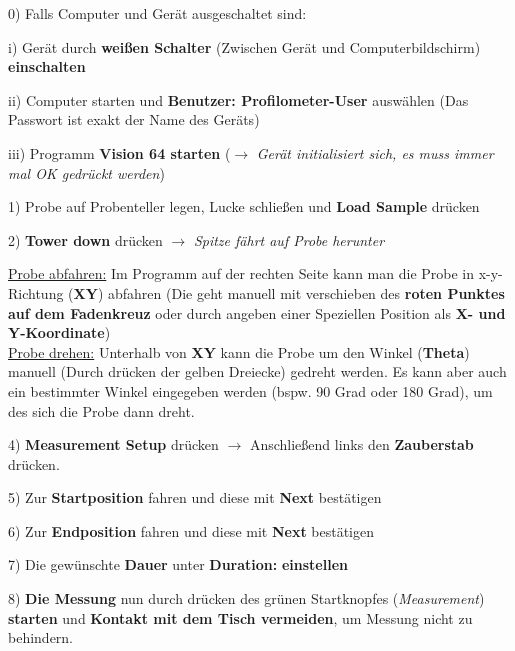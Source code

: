 \documentclass[12pt,a4paper]{article}
\begin{document}
\begin{description}
\item 0) Falls Computer und Gerät ausgeschaltet sind:
\begin{description}
\item i) Gerät durch \textbf{weißen Schalter} (Zwischen Gerät und Computerbildschirm) \textbf{einschalten}
\item ii) Computer starten und \textbf{Benutzer: Profilometer-User} auswählen (Das Passwort ist exakt der Name des Geräts)
\item iii) Programm \textbf{Vision 64 starten} ($\rightarrow$ \textit{Gerät initialisiert sich, es muss immer mal OK gedrückt werden})
\end{description}

\item 1) Probe auf Probenteller legen, Lucke schließen und \textbf{Load Sample} drücken

\item 2) \textbf{Tower down} drücken $\rightarrow$ \textit{Spitze fährt auf Probe herunter}

\underline{Probe abfahren:} Im Programm auf der rechten Seite kann man die Probe in x-y-Richtung (\textbf{XY}) abfahren (Die geht manuell mit verschieben des \textbf{roten Punktes auf dem Fadenkreuz} oder durch angeben einer Speziellen Position als \textbf{X- und Y-Koordinate})\\

\underline{Probe drehen:} Unterhalb von \textbf{XY} kann die Probe um den Winkel (\textbf{Theta}) manuell (Durch drücken der gelben Dreiecke) gedreht werden. Es kann aber auch ein bestimmter Winkel eingegeben werden (bspw. 90 Grad oder 180 Grad), um des sich die Probe dann dreht.

\item 4) \textbf{Measurement Setup} drücken $\rightarrow$ Anschließend links den \textbf{Zauberstab} drücken.

\item 5) Zur \textbf{Startposition} fahren und diese mit \textbf{Next} bestätigen
\item 6) Zur \textbf{Endposition} fahren und diese mit \textbf{Next} bestätigen

\item 7) Die gewünschte \textbf{Dauer} unter \textbf{Duration:} \textbf{einstellen}
\item 8) \textbf{Die Messung} nun durch drücken des grünen Startknopfes (\textit{Measurement}) \textbf{starten} und \textbf{Kontakt mit dem Tisch vermeiden}, um Messung nicht zu behindern.


\end{description}
\end{document}
